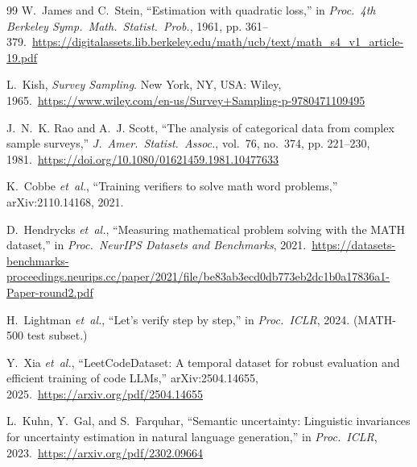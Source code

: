 \documentclass[conference]{IEEEtran}
\begin{document}
\begin{thebibliography}{99}
W.~James and C.~Stein, ``Estimation with quadratic loss,'' in \emph{Proc.\ 4th Berkeley Symp.\ Math.\ Statist.\ Prob.}, 1961, pp. 361--379.\ \url{https://digitalassets.lib.berkeley.edu/math/ucb/text/math_s4_v1_article-19.pdf}

L.~Kish, \emph{Survey Sampling}. New York, NY, USA: Wiley, 1965.\ \url{https://www.wiley.com/en-us/Survey+Sampling-p-9780471109495}

J.~N.~K. Rao and A.~J. Scott, ``The analysis of categorical data from complex sample surveys,'' \emph{J.\ Amer.\ Statist.\ Assoc.}, vol.~76, no.~374, pp. 221--230, 1981.\ \url{https://doi.org/10.1080/01621459.1981.10477633}

K.~Cobbe \emph{et~al.}, ``Training verifiers to solve math word problems,'' arXiv:2110.14168, 2021.

D.~Hendrycks \emph{et~al.}, ``Measuring mathematical problem solving with the MATH dataset,'' in \emph{Proc.\ NeurIPS Datasets and Benchmarks}, 2021.\ \url{https://datasets-benchmarks-proceedings.neurips.cc/paper/2021/file/be83ab3ecd0db773eb2dc1b0a17836a1-Paper-round2.pdf}

H.~Lightman \emph{et~al.}, ``Let's verify step by step,'' in \emph{Proc.\ ICLR}, 2024. (MATH-500 test subset.)

Y.~Xia \emph{et~al.}, ``LeetCodeDataset: A temporal dataset for robust evaluation and efficient training of code LLMs,'' arXiv:2504.14655, 2025.\ \url{https://arxiv.org/pdf/2504.14655}

L.~Kuhn, Y.~Gal, and S.~Farquhar, ``Semantic uncertainty: Linguistic invariances for uncertainty estimation in natural language generation,'' in \emph{Proc.\ ICLR}, 2023.\ \url{https://arxiv.org/pdf/2302.09664}

\end{thebibliography}
\end{document}
